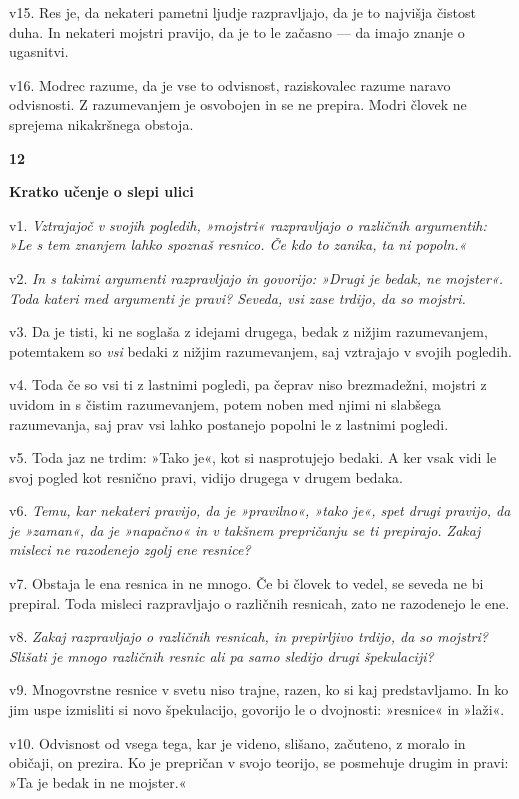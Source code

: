 v15. Res je, da nekateri pametni ljudje razpravljajo, da je to najvišja čistost duha. In nekateri mojstri pravijo, da je to le začasno --- da imajo znanje o ugasnitvi.

v16. Modrec razume, da je vse to odvisnost, raziskovalec razume naravo odvisnosti. Z razumevanjem je osvobojen in se ne prepira. Modri človek ne sprejema nikakršnega obstoja.

\textbf{12 }

\textbf{Kratko učenje o slepi ulici }

v1. \emph{Vztrajajoč v svojih pogledih, »mojstri« razpravljajo o različnih argumentih:} \emph{»Le s tem znanjem lahko spoznaš resnico. Če kdo to zanika, ta ni popoln.«}

v2. \emph{In s takimi argumenti razpravljajo in govorijo: »Drugi je bedak, ne mojster«.} \emph{Toda kateri med argumenti je pravi? Seveda, vsi zase trdijo, da so mojstri.}

v3. Da je tisti, ki ne soglaša z idejami drugega, bedak z nižjim razumevanjem, potemtakem so \emph{vsi} bedaki z nižjim razumevanjem, saj vztrajajo v svojih pogledih.

v4. Toda če so vsi ti z lastnimi pogledi, pa čeprav niso brezmadežni, mojstri z uvidom in s čistim razumevanjem, potem noben med njimi ni slabšega razumevanja, saj prav vsi lahko postanejo popolni le z lastnimi pogledi.

v5. Toda jaz ne trdim: »Tako je«, kot si nasprotujejo bedaki. A ker vsak vidi le svoj pogled kot resnično pravi, vidijo drugega v drugem bedaka.

v6. \emph{Temu, kar nekateri pravijo, da je »pravilno«, »tako je«, spet drugi pravijo, da je »zaman«, da je »napačno« in v takšnem prepričanju se ti prepirajo. Zakaj misleci ne razodenejo zgolj ene resnice?}

v7. Obstaja le ena resnica in ne mnogo. Če bi človek to vedel, se seveda ne bi prepiral. Toda misleci razpravljajo o različnih resnicah, zato ne razodenejo le ene.

v8. \emph{Zakaj razpravljajo o različnih resnicah, in prepirljivo trdijo, da so mojstri? Slišati je mnogo različnih resnic ali pa samo sledijo drugi špekulaciji?}

v9. Mnogovrstne resnice v svetu niso trajne, razen, ko si kaj predstavljamo. In ko jim uspe izmisliti si novo špekulacijo, govorijo le o dvojnosti: »resnice« in »laži«.

v10. Odvisnost od vsega tega, kar je videno, slišano, začuteno, z moralo in običaji, on prezira. Ko je prepričan v svojo teorijo, se posmehuje drugim in pravi: »Ta je bedak in ne mojster.«

